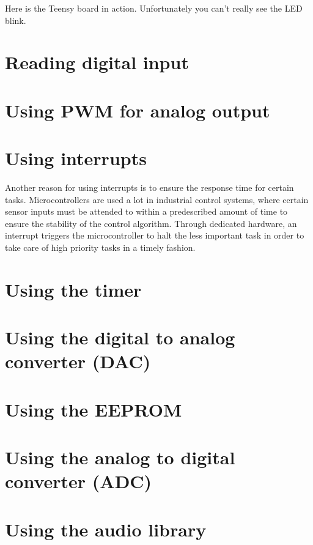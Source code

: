 \documentclass[letterpaper, 11pt]{article}
\begin{document}
Here is the Teensy board in action. Unfortunately you can't really see the LED blink. 


\section{Reading digital input}

\section{Using PWM for analog output}

\section{Using interrupts}

Another reason for using interrupts is to ensure the response time for certain tasks. Microcontrollers are used a lot in industrial control systems, where certain sensor inputs must be attended to within a predescribed amount of time to ensure the stability of the control algorithm. Through dedicated hardware, an interrupt triggers the microcontroller to halt the less important task in order to take care of high priority tasks in a timely fashion.

\section{Using the timer}

\section{Using the digital to analog converter (DAC)}

\section{Using the EEPROM}

\section{Using the analog to digital converter (ADC)}

\section{Using the audio library}
\end{document}
